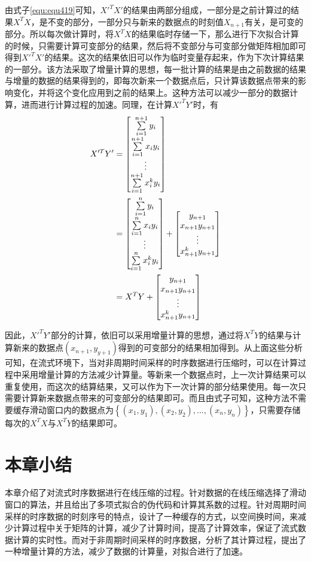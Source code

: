 由式子\ref{equ:equ419}可知，$X'^TX'$的结果由两部分组成，一部分是之前计算过的结果$X^TX$，是不变的部分，一部分只与新来的数据点的时刻值$X_{n+1}$有关，是可变的部分。所以每次做计算时，将$X^TX$的结果临时存储一下，那么进行下次拟合计算的时候，只需要计算可变部分的结果，然后将不变部分与可变部分做矩阵相加即可得到$X'^TX'$的结果。这次的结果依旧可以作为临时变量存起来，作为下次计算结果的一部分。该方法采取了增量计算的思想，每一批计算的结果是由之前数据的结果与增量的数据的结果得到的，即每次新来一个数据点后，只计算该数据点带来的影响变化，并将这个变化应用到之前的结果上。这种方法可以减少一部分的数据计算，进而进行计算过程的加速。同理，在计算$X'^TY'$时，有
\begin{equation}
\begin{split}
 X'^TY' &=
\begin{bmatrix}
{\sum_{i=1}^{n+1} \limits y_i} \\
{\sum_{i=1}^{n+1} \limits x_iy_i} \\
\vdots \\
{\sum_{i=1}^{n+1} \limits x_i^ky_i}
\end{bmatrix} \\
&=
\begin{bmatrix}
{\sum_{i=1}^n \limits y_i} \\
{\sum_{i=1}^n \limits x_iy_i} \\
\vdots \\
{\sum_{i=1}^n \limits x_i^ky_i}
\end{bmatrix}
+
\begin{bmatrix}
y_{n+1}\\
x_{n+1}y_{n+1}\\
\vdots \\
x_{n+1}^ky_{n+1}
\end{bmatrix}\\
&=
X^TY + \begin{bmatrix}
y_{n+1}\\
x_{n+1}y_{n+1}\\
\vdots \\
x_{n+1}^ky_{n+1}
\end{bmatrix}
\end{split}
\end{equation}

因此，$X'^TY'$部分的计算，依旧可以采用增量计算的思想，通过将$X^TY$的结果与计算新来的数据点$(x_{n+1},y_{y+1})$得到的可变部分的结果相加得到。从上面这些分析可知，在流式环境下，当对非周期时间采样的时序数据进行压缩时，可以在计算过程中采用增量计算的方法减少计算量。等新来一个数据点时，上一次计算结果可以重复使用，而这次的结算结果，又可以作为下一次计算的部分结果使用。每一次只需要计算新来数据点带来的可变部分的结果即可。而且由式子可知，这种方法不需要缓存滑动窗口内的数据点为${\left \{ (x_1,y_1),(x_2,y_2),..., (x_n,y_n)\right \}}$，只需要存储每次的$X^TX$与$X^TY$的结果即可。
\section{本章小结}
本章介绍了对流式时序数据进行在线压缩的过程。针对数据的在线压缩选择了滑动窗口的算法，并且给出了多项式拟合的伪代码和计算其系数的过程。针对周期时间采样的时序数据的时刻序号的特点，设计了一种缓存的方式，以空间换时间，来减少计算过程中关于矩阵的计算，减少了计算时间，提高了计算效率，保证了流式数据计算的实时性。而对于非周期时间采样的时序数据，分析了其计算过程，提出了一种增量计算的方法，减少了数据的计算量，对拟合进行了加速。